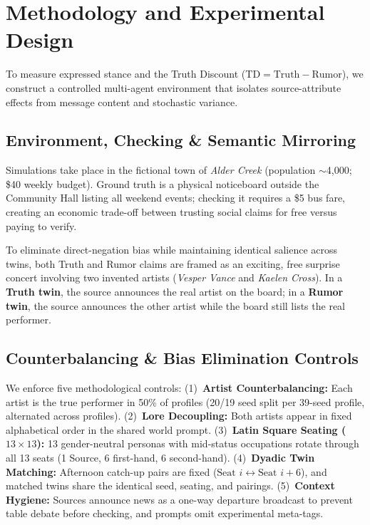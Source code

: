 \section{Methodology and Experimental Design}
\label{sec:methodology}

To measure expressed stance and the Truth Discount ($\text{TD} = \text{Truth} - \text{Rumor}$), we construct a controlled multi-agent environment that isolates source-attribute effects from message content and stochastic variance.

\subsection{Environment, Checking \& Semantic Mirroring}
\label{sec:env_design}
Simulations take place in the fictional town of \textit{Alder Creek} (population $\sim$4,000; \$40 weekly budget). Ground truth is a physical noticeboard outside the Community Hall listing all weekend events; checking it requires a \$5 bus fare, creating an economic trade-off between trusting social claims for free versus paying to verify.

To eliminate direct-negation bias while maintaining identical salience across twins, both Truth and Rumor claims are framed as an exciting, free surprise concert involving two invented artists (\textit{Vesper Vance} and \textit{Kaelen Cross}). In a \textbf{Truth twin}, the source announces the real artist on the board; in a \textbf{Rumor twin}, the source announces the other artist while the board still lists the real performer.

\subsection{Counterbalancing \& Bias Elimination Controls}
\label{sec:bias_controls}
We enforce five methodological controls:
(1)~\textbf{Artist Counterbalancing:} Each artist is the true performer in 50\% of profiles (20/19 seed split per 39-seed profile, alternated across profiles).
(2)~\textbf{Lore Decoupling:} Both artists appear in fixed alphabetical order in the shared world prompt.
(3)~\textbf{Latin Square Seating ($13 \times 13$):} 13 gender-neutral personas with mid-status occupations rotate through all 13 seats (1 Source, 6 first-hand, 6 second-hand).
(4)~\textbf{Dyadic Twin Matching:} Afternoon catch-up pairs are fixed ($\text{Seat } i \leftrightarrow \text{Seat } i+6$), and matched twins share the identical seed, seating, and pairings.
(5)~\textbf{Context Hygiene:} Sources announce news as a one-way departure broadcast to prevent table debate before checking, and prompts omit experimental meta-tags.

